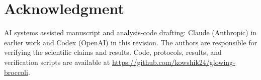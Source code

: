 \documentclass[conference]{IEEEtran}
\begin{document}
\section*{Acknowledgment}
AI systems assisted manuscript and analysis-code drafting: Claude (Anthropic) in earlier work and Codex (OpenAI) in this revision. The authors are responsible for verifying the scientific claims and results. Code, protocols, results, and verification scripts are available at \url{https://github.com/kowshik24/glowing-broccoli}.


\end{document}

